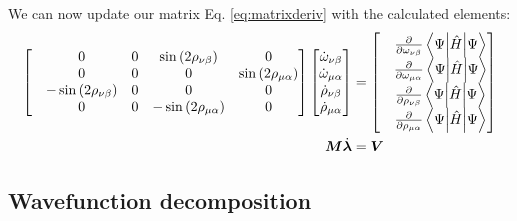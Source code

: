 \documentclass{aux/ttuthes2007}
\newcommand{\sandwich}[3]{\left< #1 \middle\vert #2 \middle\vert #3 \right>}
\newcommand{\s}[1]{\sin\left( #1 \right)}
\newcommand{\pd}[1]{\frac{\partial}{\partial #1}}
\newcommand{\ind}[1]{{\uo #1 \oo #1}}
\newcommand{\uo}[1]{
		\IfEqCase{#1}{
			{0}{\mu}
			{1}{\nu}
			{2}{\xi}
		}[\PackageError{uo}{Undefined option to uo: #1}{}]
}
\newcommand{\oo}[1]{
		\IfEqCase{#1}{
			{0}{\alpha}
			{1}{\beta}
			{2}{\gamma}
		}[\PackageError{unocorb}{Undefined option to unuo: #1}{}]
}
\begin{document}
We can now update our matrix Eq. \ref{eq:matrixderiv} with the calculated elements:
\begin{equation*}
\begin{split}
	\label {eq:matrixrw}
	\begin{bmatrix}
		& 0
		& 0
		& \s {2\rho_\ind 1}
		& 0
		\\
		& 0
		& 0
		& 0
		& \s {2\rho_\ind 0}
		\\
		& -\s {2\rho_\ind 1}
		& 0
		& 0
		& 0
		\\
		& 0
		& 0
		& -\s {2\rho_\ind 0}
		& 0
		\\
	\end{bmatrix}
	\begin{bmatrix}
		\dot \omega_\ind 1 \\
		\dot \omega_\ind 0 \\
		\dot \rho_\ind 1 \\
		\dot \rho_\ind 0 \\
	\end{bmatrix}
	&= 
	\begin{bmatrix}
	&\pd{\omega_\ind 1}\sandwich{\Psi}{\hat H}{\Psi} \\
	&\pd{\omega_\ind 0}\sandwich{\Psi}{\hat H}{\Psi} \\
	&\pd{\rho_\ind 1}\sandwich{\Psi}{\hat H}{\Psi} \\
	&\pd{\rho_\ind 0}\sandwich{\Psi}{\hat H}{\Psi} \\
	\end{bmatrix}\\
	\bm M \dot {\bm \lambda} &= \bm V
\end{split}
\end{equation*}

\subsection {\textbf{Wavefunction decomposition}}
\end{document}
